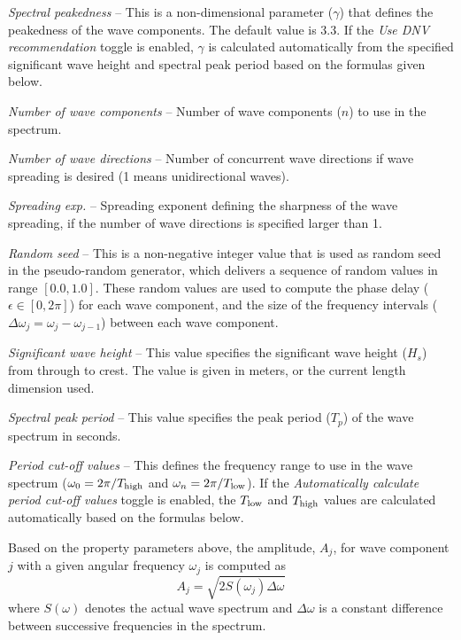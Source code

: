 \begin{bulletlist}
\item{\sl Spectral peakedness} --
  This is a non-dimensional parameter ($\gamma$) that defines the peakedness
  of the wave components. The default value is 3.3.
  If the {\sl Use DNV recommendation} toggle is enabled, $\gamma$ is calculated
  automatically from the specified significant wave height and spectral peak
  period based on the formulas given below.
\item{\sl Number of wave components} --
  Number of wave components ($n$) to use in the spectrum.
\item{\sl Number of wave directions} --
  Number of concurrent wave directions if wave spreading is desired
  (1 means unidirectional waves).
\item{\sl Spreading exp.} --
  Spreading exponent defining the sharpness of the wave spreading,
  if the number of wave directions is specified larger than 1.
\item{\sl Random seed} --
  This is a non-negative integer value that is used as random seed in
  the pseudo-random generator, which delivers a sequence of random values
  in range $[0.0,1.0]$. These random values are used to compute the phase delay
  ($\epsilon\in[0,2\pi]$) for each wave component, and the size of the frequency
  intervals ($\Delta\omega_j=\omega_j-\omega_{j-1}$) between each wave component.
\item{\sl Significant wave height} --
  This value specifies the significant wave height ($H_s$)
  from through to crest. The value is given in meters,
  or the current length dimension used.
\item{\sl Spectral peak period} --
  This value specifies the peak period ($T_p$) of the wave spectrum in seconds.
\item{\sl Period cut-off values} --
  This defines the frequency range to use in the wave spectrum
  ($\omega_0=2\pi/T_{\rm high}$ and $\omega_n=2\pi/T_{\rm low}$).
  If the {\sl Automatically calculate period cut-off values} toggle is enabled,
  the $T_{\rm low}$ and $T_{\rm high}$ values are calculated automatically based on
  the formulas below.
\end{bulletlist}

Based on the property parameters above, the amplitude, $A_j$,
for wave component $j$ with a given angular frequency $\omega_j$ is computed as
%
\begin{equation}
A_j = \sqrt{2S(\omega_j)\Delta\omega}
\end{equation}
%
where $S(\omega)$ denotes the actual wave spectrum and $\Delta\omega$
is a constant difference between successive frequencies in the spectrum.

